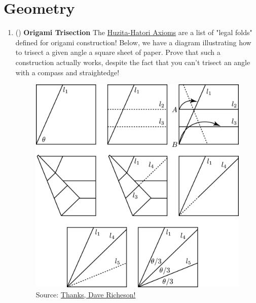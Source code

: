 \documentclass[11pt]{scrartcl}
\begin{document}
\section{Geometry}
\begin{enumerate}[label=\textbf{G\arabic*}.]
    \item (\fullchili) \textbf{Origami Trisection} \newline
    The \href{https://en.wikipedia.org/wiki/Huzita\%E2\%80\%93Hatori_axioms}{Huzita-Hatori Axioms} are a list of "legal folds" defined for origami construction! Below, we have a diagram illustrating how to trisect a given angle a square sheet of paper. Prove that such a construction actually works, despite the fact that you can't trisect an angle with a compass and straightedge!
    \newline
    \begin{figure}[h]
        \centering
        \includegraphics[width = 12cm]{Diagrams/Origami Trisection.png}
        \caption{Source: \href{https://divisbyzero.files.wordpress.com/2012/06/origamitrisection.png?w=500}{Thanks, Dave Richeson!}}
        \label{fig:Origami_Trisection}
    \end{figure}
\end{enumerate}

\newpage
\end{document}
